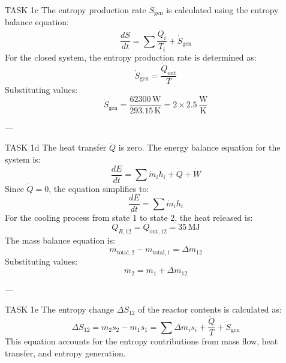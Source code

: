TASK 1c  
The entropy production rate \( \dot{S}_{\text{gen}} \) is calculated using the entropy balance equation:  
\[
\frac{dS}{dt} = \sum \frac{\dot{Q}_i}{T_i} + \dot{S}_{\text{gen}}
\]  
For the closed system, the entropy production rate is determined as:  
\[
\dot{S}_{\text{gen}} = \frac{\dot{Q}_{\text{out}}}{T}
\]  
Substituting values:  
\[
\dot{S}_{\text{gen}} = \frac{62300 \, \text{W}}{293.15 \, \text{K}} = 2 \times 2.5 \, \frac{\text{W}}{\text{K}}
\]  

---

TASK 1d  
The heat transfer \( \dot{Q} \) is zero.  
The energy balance equation for the system is:  
\[
\frac{dE}{dt} = \sum \dot{m}_i h_i + \dot{Q} + \dot{W}
\]  
Since \( \dot{Q} = 0 \), the equation simplifies to:  
\[
\frac{dE}{dt} = \sum \dot{m}_i h_i
\]  
For the cooling process from state 1 to state 2, the heat released is:  
\[
Q_{R,12} = Q_{\text{out},12} = 35 \, \text{MJ}
\]  
The mass balance equation is:  
\[
m_{\text{total},2} - m_{\text{total},1} = \Delta m_{12}
\]  
Substituting values:  
\[
m_2 = m_1 + \Delta m_{12}
\]  

---

TASK 1e  
The entropy change \( \Delta S_{12} \) of the reactor contents is calculated as:  
\[
\Delta S_{12} = m_2 s_2 - m_1 s_1 = \sum \Delta m_i s_i + \frac{\dot{Q}}{T} + \dot{S}_{\text{gen}}
\]  
This equation accounts for the entropy contributions from mass flow, heat transfer, and entropy generation.
